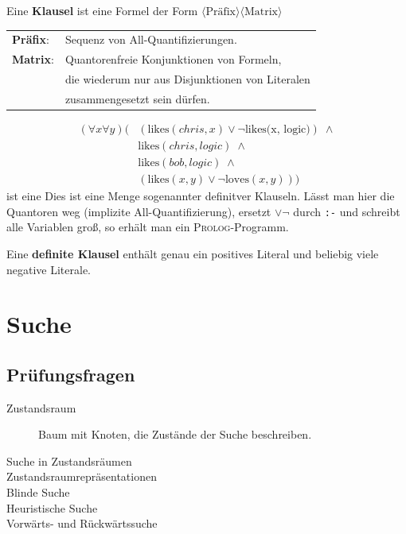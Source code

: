 \documentclass[runningheads,deutsch]{llncs}
\begin{document}
Eine \textbf{Klausel} ist eine Formel der Form $\langle\text{Präfix}\rangle\langle\text{Matrix}\rangle$


\begin{tabular}{l l}
    \textbf{Präfix}: & Sequenz von All-Quantifizierungen. \\
    \textbf{Matrix}: & Quantorenfreie Konjunktionen von Formeln, \\
                     &  die wiederum nur aus Disjunktionen von Literalen \\
                     & zusammengesetzt sein dürfen.    
\end{tabular}

\begin{example}
    \begin{align*}
        (\forall x\forall y)( &(\text{likes}(chris, x) \lor \lnot \text{likes(x, logic)})\; \land \\
        & \text{likes}(chris, logic)\; \land \\
        & \text{likes}(bob, logic)\; \land \\
        & (\text{likes}(x,y) \lor \lnot \text{loves}(x, y)))
    \end{align*} ist eine 
    Dies ist eine Menge sogenannter definitver Klauseln.
    Lässt man hier die Quantoren weg (implizite All-Quantifizierung), ersetzt $\lor\lnot$ durch \texttt{:-} und schreibt alle Variablen groß, so erhält man ein \textsc{Prolog}-Programm.
\end{example}

Eine \textbf{definite Klausel} enthält genau ein positives Literal und beliebig viele negative Literale.

\section{Suche}

\subsection{Prüfungsfragen}
\begin{description}
    \item[Zustandsraum] Baum mit Knoten, die Zustände der Suche beschreiben. 
    \item[Suche in Zustandsräumen] 
    \item[Zustandsraumrepräsentationen] 
    \item[Blinde Suche] 
    \item[Heuristische Suche]
    \item[Vorwärts- und Rückwärtssuche]  
\end{description}
\end{document}
